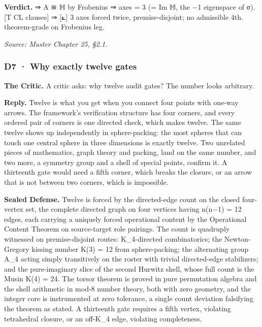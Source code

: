\documentclass[10pt,twocolumn]{article}
\begin{document}
\textbf{Verdict.} ⇒ A ≅ ℍ by Frobenius ⇒ \textbar axes\textbar{} = 3 (=
Im ℍ, the −1 eigenspace of σ). {[}T \textbar{} CL clauses{]} ⇒ {[}⟀{]} 3
axes forced twice, premise-disjoint; no admissible 4th. theorem-grade on
Frobenius leg.

\emph{Source: Master Chapter 25, §2.1.}

\hypertarget{d7-why-exactly-twelve-gates}{%
\subsubsection{D7 · Why exactly twelve
gates}\label{d7-why-exactly-twelve-gates}}

\textbf{The Critic.} A critic asks: why twelve audit gates? The number
looks arbitrary.

\textbf{Reply.} Twelve is what you get when you connect four points with
one-way arrows. The framework's verification structure has four corners,
and every ordered pair of corners is one directed check, which makes
twelve. The same twelve shows up independently in sphere-packing: the
most spheres that can touch one central sphere in three dimensions is
exactly twelve. Two unrelated pieces of mathematics, graph theory and
packing, land on the same number, and two more, a symmetry group and a
shell of special points, confirm it. A thirteenth gate would need a
fifth corner, which breaks the closure, or an arrow that is not between
two corners, which is impossible.

\textbf{Sealed Defense.} Twelve is forced by the directed-edge count on
the closed four-vertex set, the complete directed graph on four vertices
having n(n−1) = 12 edges, each carrying a uniquely forced operational
content by the Operational Content Theorem on source-target role
pairings. The count is quadruply witnessed on premise-disjoint routes:
K\_4-directed combinatorics; the Newton-Gregory kissing number K(3) = 12
from sphere-packing; the alternating group A\_4 acting simply
transitively on the roster with trivial directed-edge stabilizers; and
the pure-imaginary slice of the second Hurwitz shell, whose full count
is the Musin K(4) = 24. The torsor theorem is proved in pure permutation
algebra and the shell arithmetic in mod-8 number theory, both with zero
geometry, and the integer core is instrumented at zero tolerance, a
single count deviation falsifying the theorem as stated. A thirteenth
gate requires a fifth vertex, violating tetrahedral closure, or an
off-K\_4 edge, violating completeness.
\end{document}
